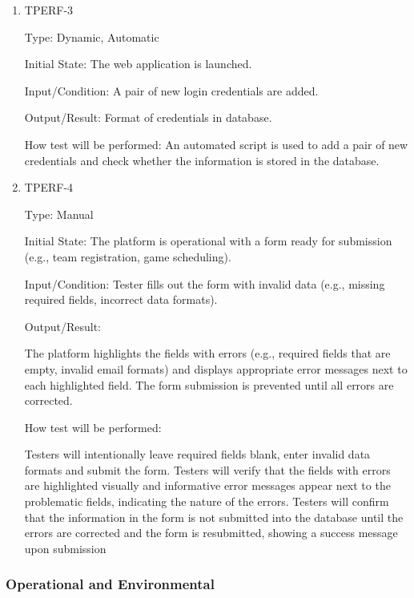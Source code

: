 \documentclass[12pt, titlepage]{article}
\begin{document}
\begin{enumerate}
  \item{TPERF-3\\}

        Type: Dynamic, Automatic

        Initial State: The web application is launched.

        Input/Condition: A pair of new login credentials are added.

        Output/Result: Format of credentials in database.

        How test will be performed: An automated script is used to add a pair of
        new credentials and check whether the information is stored in the database.

  \item{TPERF-4\\}

        Type: Manual

        Initial State: The platform is operational with a form ready for submission (e.g., team registration, game scheduling).

        Input/Condition: Tester fills out the form with invalid data (e.g., missing required fields, incorrect data formats).

        Output/Result:

        The platform highlights the fields with errors (e.g., required fields that are empty, invalid email formats) and displays appropriate error messages  next to each highlighted field. The form submission is prevented until all errors are corrected.

        How test will be performed:

        Testers will intentionally leave required fields blank, enter invalid data formats  and submit the form. Testers will verify that the fields with errors are highlighted visually and informative error messages appear next to the problematic fields, indicating the nature of the errors. Testers will confirm that the information in the form is not submitted into the database until the errors are corrected and the form is resubmitted, showing a success message upon submission
\end{enumerate}


\subsubsection{Operational and Environmental}
\end{document}
